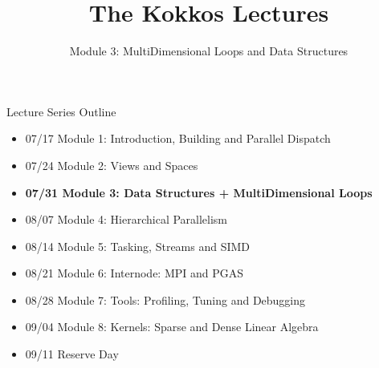 
\def\sandid{SAND2020-7908 PE}

\title{The Kokkos Lectures}

\author{Module 3: MultiDimensional Loops and Data Structures}




\shortfalse
\mediumtrue
\fulltrue
\notoverviewtrue



% 

\begin{frame}
	\titlepage
\end{frame}



\begin{frame}{Lecture Series Outline}

\begin{itemize}
        \item 07/17 Module 1: Introduction, Building and Parallel Dispatch
        \item 07/24 Module 2: Views and Spaces
	\item \textbf{07/31 Module 3: Data Structures + MultiDimensional Loops}
        \item 08/07 Module 4: Hierarchical Parallelism
        \item 08/14 Module 5: Tasking, Streams and SIMD
        \item 08/21 Module 6: Internode: MPI and PGAS
        \item 08/28 Module 7: Tools: Profiling, Tuning and Debugging
        \item 09/04 Module 8: Kernels: Sparse and Dense Linear Algebra
        \item 09/11 Reserve Day
\end{itemize}
\end{frame}

